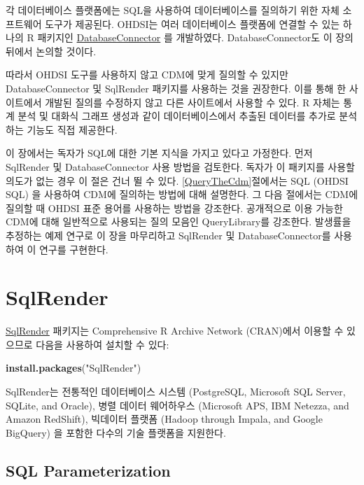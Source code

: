 \documentclass[11pt]{book}
\newenvironment{Shaded}{\begin{snugshade}}{\end{snugshade}}
\newcommand{\KeywordTok}[1]{\textcolor[rgb]{0.13,0.29,0.53}{\textbf{#1}}}
\newcommand{\StringTok}[1]{\textcolor[rgb]{0.31,0.60,0.02}{#1}}
\newcommand{\NormalTok}[1]{#1}
\theoremstyle{definition}
\theoremstyle{definition}
\theoremstyle{definition}
\theoremstyle{remark}
\begin{document}
각 데이터베이스 플랫폼에는 SQL을 사용하여 데이터베이스를 질의하기 위한
자체 소프트웨어 도구가 제공된다. OHDSI는 여러 데이터베이스 플랫폼에
연결할 수 있는 하나의 R 패키지인
\href{https://ohdsi.github.io/DatabaseConnector/}{DatabaseConnector} 를
개발하였다. DatabaseConnector도 이 장의 뒤에서 논의할 것이다.

따라서 OHDSI 도구를 사용하지 않고 CDM에 맞게 질의할 수 있지만
DatabaseConnector 및 SqlRender 패키지를 사용하는 것을 권장한다. 이를
통해 한 사이트에서 개발된 질의를 수정하지 않고 다른 사이트에서 사용할 수
있다. R 자체는 통계 분석 및 대화식 그래프 생성과 같이 데이터베이스에서
추출된 데이터를 추가로 분석하는 기능도 직접 제공한다. 

이 장에서는 독자가 SQL에 대한 기본 지식을 가지고 있다고 가정한다. 먼저
SqlRender 및 DatabaseConnector 사용 방법을 검토한다. 독자가 이 패키지를
사용할 의도가 없는 경우 이 절은 건너 뛸 수 있다.
\ref{QueryTheCdm}절에서는 SQL (OHDSI SQL) 을 사용하여 CDM에 질의하는
방법에 대해 설명한다. 그 다음 절에서는 CDM에 질의할 때 OHDSI 표준 용어를
사용하는 방법을 강조한다. 공개적으로 이용 가능한 CDM에 대해 일반적으로
사용되는 질의 모음인 QueryLibrary를 강조한다. 발생률을 추정하는 예제
연구로 이 장을 마무리하고 SqlRender 및 DatabaseConnector를 사용하여 이
연구를 구현한다. 

\hypertarget{SqlRender}{\section{SqlRender}\label{SqlRender}}

\href{https://ohdsi.github.io/SqlRender/}{SqlRender} 패키지는
Comprehensive R Archive Network (CRAN)에서 이용할 수 있으므로 다음을
사용하여 설치할 수 있다:

\begin{Shaded}
\begin{Highlighting}[]
\KeywordTok{install.packages}\NormalTok{(}\StringTok{"SqlRender"}\NormalTok{)}
\end{Highlighting}
\end{Shaded}

SqlRender는 전통적인 데이터베이스 시스템 (PostgreSQL, Microsoft SQL
Server, SQLite, and Oracle), 병렬 데이터 웨어하우스 (Microsoft APS, IBM
Netezza, and Amazon RedShift), 빅데이터 플랫폼 (Hadoop through Impala,
and Google BigQuery) 을 포함한 다수의 기술 플랫폼을 지원한다.

\subsection{SQL Parameterization}\label{sql-parameterization}
\end{document}
